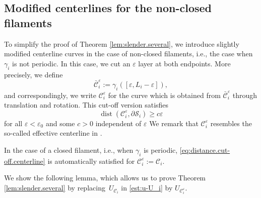 \documentclass[11pt]{article}
\newcommand{\ie}{i.e.,\xspace}
\let\eps\varepsilon
\DeclareMathOperator{\dist}{dist}
\theoremstyle{definition}
\theoremstyle{remark}
\begin{document}
\subsection{Modified centerlines for the non-closed filaments}
\label{sec:non-closed}

To simplify the proof of Theorem \ref{lem:slender.several},
we introduce slightly modified centerline curves in the case of non-closed filaments, \ie the case when $\gamma_i$ is not periodic. In this case, we cut an $\eps$ layer at both endpoints. More precisely, we define
\begin{equation}
\bar {\mathcal C}_i^\eps := \gamma_i([\eps,L_i - \eps]),
\end{equation}
and correspondingly, we write $\mathcal C_i^\eps$ for the curve which is obtained from $\bar {\mathcal C}_i^\eps$ through translation and rotation.
This cut-off version satisfies
\begin{equation} \label{eq:distance.cut-off.centerline}
\dist(\mathcal C_i^\eps,\partial \mathcal S_i) \geq c \eps
\end{equation}
for all $\eps < \eps_0$ and some $c > 0$ independent of $\eps$
We remark that $\mathcal C_i^\eps$ resembles the so-called effective centerline in \cite{Mori-Ohm-free-ends}.

In the case of a closed filament, \ie when $\gamma_i$ is periodic, \eqref{eq:distance.cut-off.centerline} is automatically satisfied for $\mathcal C_i^\eps := \mathcal C_i$.

We show the following lemma, which allows us to prove Theorem \ref{lem:slender.several} by replacing~$U_{\mathcal C_i}$ in \eqref{est:u-U_i} by
$U_{\mathcal C_i^\eps}$.
\end{document}
